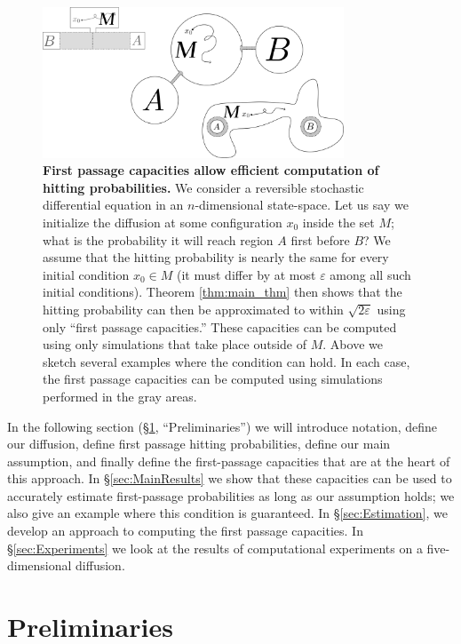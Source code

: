 \documentclass[12pt, nofootinbib,english, amsmath, amssymb, aps, priprint, graphicx,floatfix]{revtex4-1}
\theoremstyle{plain}
\theoremstyle{definition}
\theoremstyle{plain}
\begin{document}
\begin{figure}
    \centering  \includegraphics[width=0.8\textwidth]{bigpicture.png}
    \caption{\footnotesize\linespread{1.}\selectfont{} {\bf First passage capacities allow efficient computation of hitting probabilities.} We consider a reversible stochastic differential equation in an $n$-dimensional state-space.  Let us say we initialize the diffusion at some configuration $x_0$ inside the set $M$; what is the probability it will reach region $A$ first before $B$?  We assume that the hitting probability is nearly the same for every initial condition $x_0 \in M$ (it must differ by at most $\varepsilon$ among all such initial conditions).  Theorem \ref{thm:main_thm} then shows that the hitting probability can then be approximated to within $\sqrt{2\varepsilon}$ using only ``first passage capacities.'' These capacities can be computed using only simulations that take place outside of $M$.  Above we sketch several examples where the condition can hold.  In each case, the first passage capacities can be computed using simulations performed in the gray areas.}
\label{fig:ToyModel}
\end{figure}

In the following section (\S\ref{sec:Preliminaries}, ``Preliminaries'') we will introduce notation, define our diffusion, define first passage hitting probabilities, define our main assumption, and finally define the first-passage capacities that are at the heart of this approach.  In \S\ref{sec:MainResults} we show that these capacities can be used to accurately estimate first-passage probabilities as long as our assumption holds; we also give an example where this condition is guaranteed.  In \S\ref{sec:Estimation}, we develop an approach to computing the first passage capacities.   In \S\ref{sec:Experiments} we look at the results of computational experiments on a five-dimensional diffusion.  


\section{Preliminaries}
\label{sec:Preliminaries}
\end{document}
